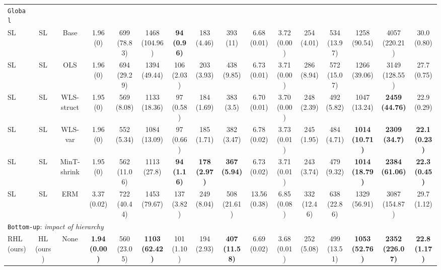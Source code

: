 \documentclass[preprint, 3p, times, twocolumn]{elsarticle}
\begin{document}
\begin{table}
\begin{center}
{\begin{tabular}{l c cccccccccccccc}
  \midrule																	
  \texttt{Global}																	\\
  \hspace{0.1cm} 	SL	&SL	&Base	&1.96 (0)	&699 (78.83)	&1468 (104.96)	&\textbf{94 (0.96)}	&183 (4.46)	&393 (11)	&6.68 (0.01)	&3.72 (0.00)	&254 (4.01)	&534 (13.97)	&1258 (90.54)	&4057 (220.21)	&30.0 (0.80)	\\
  \hspace{0.1cm} 	SL	&SL	&OLS	&1.96 (0)	&694 (29.29)	&1394 (49.44)	&106 (2.03)	&203 (3.93)	&438 (9.85)	&6.73 (0.01)	&3.71 (0.00)	&286 (8.94)	&572 (15.07)	&1266 (39.06)	&3149 (128.55)	&27.7 (0.75)	\\
  \hspace{0.1cm} 	SL	&SL	&WLS-struct	&1.95 (0)	&569 (8.08)	&1133 (18.36)	&97 (0.58)	&184 (1.69)	&383 (3.5)	&6.70 (0.01)	&3.70 (0.00)	&248 (2.39)	&492 (5.82)	&1047 (13.24)	&\textbf{2459 (44.76)}	&22.9 (0.29)	\\
  \hspace{0.1cm} 	SL	&SL	&WLS-var	&1.96 (0)	&552 (5.34)	&1084 (13.09)	&97 (0.66)	&185 (1.71)	&382 (3.47)	&6.78 (0.02)	&3.73 (0.01)	&245 (1.95)	&484 (4.71)	&\textbf{1014 (10.71)}	&\textbf{2309 (34.7)}	&\textbf{22.1 (0.23)}	\\
  \hspace{0.1cm} 	SL	&SL	&MinT-shrink	&1.95 (0)	&562 (11.06)	&1113 (27.8)	&\textbf{94 (1.16)}	&\textbf{178 (2.97)}	&\textbf{367 (5.94)}	&6.73 (0.02)	&3.71 (0.01)	&243 (3.74)	&479 (9.32)	&\textbf{1014 (18.79)}	&\textbf{2384 (61.06)}	&\textbf{22.3 (0.45)}	\\
  \hspace{0.1cm} 	SL	&SL	&ERM	&3.37 (0.02)	&722 (40.44)	&1453 (79.67)	&137 (3.82)	&249 (8.04)	&508 (21.61)	&13.56 (0.38)	&6.85 (0.08)	&332 (12.46)	&638 (22.86)	&1329 (56.91)	&3087 (154.87)	&29.7 (1.12)	\\ 
  
  \midrule
  \midrule
  \multicolumn{4}{l}{\texttt{Bottom-up}: \textit{impact of hierarchy}}																	\\
  \hspace{0.1cm} 	RHL (ours)	&HL (ours)	&None	&\textbf{1.94 (0.00)}	&560 (23.05)	&\textbf{1103 (62.42)}	&101 (1.10)	&194 (2.93)	&\textbf{407 (11.58)}	&6.69 (0.02)	&3.68 (0.01)	&252 (5.08)	&499 (13.51)	&\textbf{1053 (52.76)}	&\textbf{2352 (226.07)}	&\textbf{22.8 (1.17)}	\\
  \bottomrule
  
\end{tabular}}
  \end{center}
  \end{table}
\end{document}
